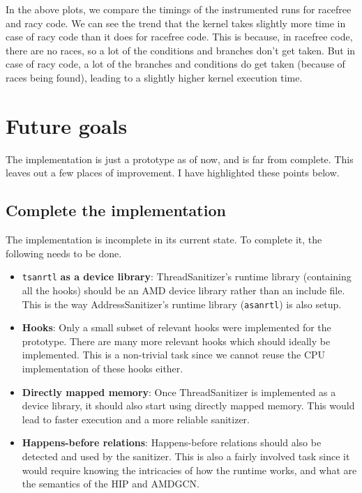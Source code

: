 \documentclass{btp}
\begin{document}
In the above plots, we compare the timings of the instrumented runs for racefree and racy code. We can see the trend that the kernel takes slightly more time in case of racy code than it does for racefree code. This is because, in racefree code, there are no races, so a lot of the conditions and branches don't get taken. But in case of racy code, a lot of the branches and conditions do get taken (because of races being found), leading to a slightly higher kernel execution time.

\section{Future goals}

The implementation is just a prototype as of now, and is far from complete. This leaves out a few places of improvement. I have highlighted these points below.

\subsection{Complete the implementation}

The implementation is incomplete in its current state. To complete it, the following needs to be done.

\begin{itemize}
	\item \texttt{tsanrtl} \textbf{as a device library}: ThreadSanitizer's runtime library (containing all the hooks) should be an AMD device library rather than an include file. This is the way AddressSanitizer's runtime library (\texttt{asanrtl}) is also setup.
	\item \textbf{Hooks}: Only a small subset of relevant hooks were implemented for the prototype. There are many more relevant hooks which should ideally be implemented. This is a non-trivial task since we cannot reuse the CPU implementation of these hooks either.
	\item \textbf{Directly mapped memory}: Once ThreadSanitizer is implemented as a device library, it should also start using directly mapped memory. This would lead to faster execution and a more reliable sanitizer.
	\item \textbf{Happens-before relations}: Happens-before relations should also be detected and used by the sanitizer. This is also a fairly involved task since it would require knowing the intricacies of how the runtime works, and what are the semantics of the HIP and AMDGCN.
\end{itemize}
\end{document}
